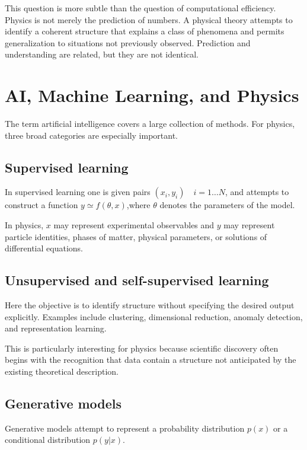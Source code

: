 \documentclass[11pt,a4paper]{article}
\begin{document}
This question is more subtle than the question of computational efficiency.
Physics is not merely the prediction of numbers. A physical theory attempts to
identify a coherent structure that explains a class of phenomena and permits
generalization to situations not previously observed. Prediction and
understanding are related, but they are not identical.

\section{AI, Machine Learning, and Physics}

The term artificial intelligence covers a large collection of methods. For
physics, three broad categories are especially important.

\subsection{Supervised learning}

In supervised learning one is given pairs $(x_i,y_i)\quad i=1\dots N$,
and attempts to construct a function $y\simeq f(\theta,x)$,where $\theta$ 
denotes the parameters of the model.

In physics, $x$ may represent experimental observables and $y$ may represent
particle identities, phases of matter, physical parameters, or solutions of
differential equations.

\subsection{Unsupervised and self-supervised learning}

Here the objective is to identify structure without specifying the desired
output explicitly. Examples include clustering, dimensional reduction,
anomaly detection, and representation learning.

This is particularly interesting for physics because scientific discovery often
begins with the recognition that data contain a structure not anticipated by
the existing theoretical description.

\subsection{Generative models}

Generative models attempt to represent a probability distribution
$p(x)$ or a conditional distribution $p(y|x)$.
\end{document}

